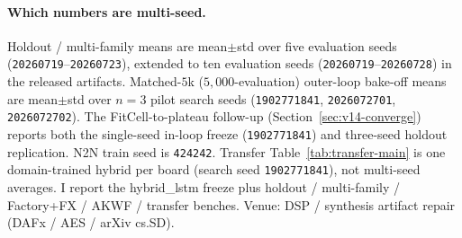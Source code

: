 \paragraph{Which numbers are multi-seed.}
Holdout / multi-family means are mean$\pm$std over five evaluation seeds (\texttt{20260719}--\texttt{20260723}), extended to ten evaluation seeds (\texttt{20260719}--\texttt{20260728}) in the released artifacts.
Matched-$5$k ($5{,}000$-evaluation) outer-loop bake-off means are mean$\pm$std over $n{=}3$ pilot search seeds (\texttt{1902771841}, \texttt{2026072701}, \texttt{2026072702}).
The FitCell-to-plateau follow-up (Section~\ref{sec:v14-converge}) reports both the single-seed in-loop freeze (\texttt{1902771841}) and three-seed holdout replication.
N2N train seed is \texttt{424242}.
Transfer Table~\ref{tab:transfer-main} is one domain-trained hybrid per board (search seed \texttt{1902771841}), not multi-seed averages.
I report the hybrid\_lstm freeze plus holdout / multi-family / Factory+FX / AKWF / transfer benches.
Venue: DSP / synthesis artifact repair (DAFx / AES / arXiv cs.SD).

